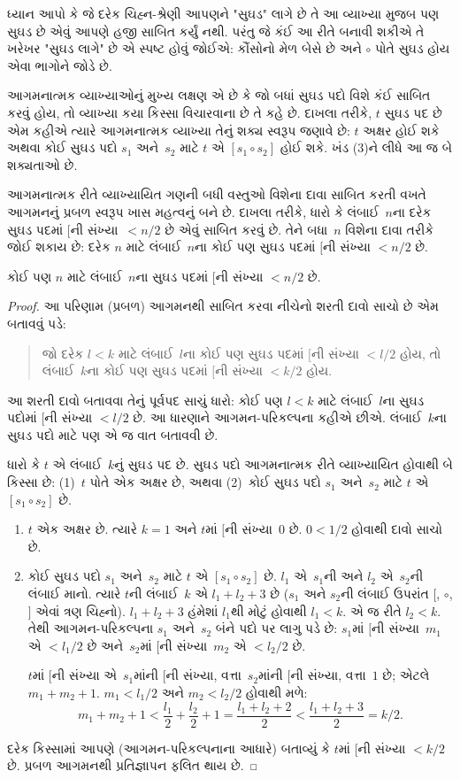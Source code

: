 \documentclass[../../../include/open-logic-section]{subfiles}
\begin{document}
ધ્યાન આપો કે જે દરેક ચિહ્ન-શ્રેણી આપણને "સુઘડ"
લાગે છે તે આ વ્યાખ્યા મુજબ પણ સુઘડ છે એવું
આપણે હજી સાબિત કર્યું નથી. પરંતુ જે કંઈ આ
રીતે બનાવી શકીએ તે ખરેખર "સુઘડ લાગે" છે
એ સ્પષ્ટ હોવું જોઈએ: કૌંસોનો મેળ બેસે છે અને
$\circ$ પોતે સુઘડ હોય એવા ભાગોને જોડે છે.

આગમનાત્મક વ્યાખ્યાઓનું મુખ્ય લક્ષણ એ છે કે જો
બધાં સુઘડ પદો વિશે કંઈ સાબિત કરવું હોય, તો વ્યાખ્યા
કયા કિસ્સા વિચારવાના છે તે કહે છે. દાખલા તરીકે,
$t$ સુઘડ પદ છે એમ કહીએ ત્યારે આગમનાત્મક
વ્યાખ્યા તેનું શક્ય સ્વરૂપ જણાવે છે: $t$ અક્ષર
હોઈ શકે અથવા કોઈ સુઘડ પદો $s_1$ અને~$s_2$
માટે $t$ એ $[s_1 \circ s_2]$ હોઈ શકે. ખંડ (3)ને
લીધે આ જ બે શક્યતાઓ છે.

આગમનાત્મક રીતે વ્યાખ્યાયિત ગણની બધી વસ્તુઓ
વિશેના દાવા સાબિત કરતી વખતે આગમનનું પ્રબળ સ્વરૂપ
ખાસ મહત્વનું બને છે. દાખલા તરીકે, ધારો કે
લંબાઈ~$n$ના દરેક સુઘડ પદમાં $[$ની સંખ્યા~$< n/2$
છે એવું સાબિત કરવું છે. તેને બધા~$n$ વિશેના
દાવા તરીકે જોઈ શકાય છે: દરેક $n$ માટે લંબાઈ~$n$ના
કોઈ પણ સુઘડ પદમાં $[$ની સંખ્યા $< n/2$ છે.

\begin{prop}
  કોઈ પણ $n$ માટે લંબાઈ~$n$ના સુઘડ પદમાં
  $[$ની સંખ્યા $< n/2$ છે.
\end{prop}

\begin{proof}
આ પરિણામ (પ્રબળ) આગમનથી સાબિત કરવા નીચેનો
શરતી દાવો સાચો છે એમ બતાવવું પડે:
\begin{quote}
  જો દરેક $l < k$ માટે લંબાઈ~$l$ના કોઈ પણ
  સુઘડ પદમાં $[$ની સંખ્યા $< l/2$ હોય,
  તો લંબાઈ~$k$ના કોઈ પણ સુઘડ પદમાં
  $[$ની સંખ્યા $< k/2$ હોય.
\end{quote}
આ શરતી દાવો બતાવવા તેનું પૂર્વપદ સાચું ધારો:
કોઈ પણ $l<k$ માટે લંબાઈ~$l$ના સુઘડ પદોમાં
$[$ની સંખ્યા $< l/2$ છે. આ ધારણાને
આગમન-પરિકલ્પના કહીએ છીએ. લંબાઈ~$k$ના
સુઘડ પદો માટે પણ એ જ વાત બતાવવી છે.

ધારો કે $t$ એ લંબાઈ~$k$નું સુઘડ પદ છે.
સુઘડ પદો આગમનાત્મક રીતે વ્યાખ્યાયિત હોવાથી
બે કિસ્સા છે: (1)~$t$ પોતે એક અક્ષર છે,
અથવા (2)~કોઈ સુઘડ પદો $s_1$ અને~$s_2$
માટે $t$ એ $[s_1 \circ s_2]$ છે.
\begin{enumerate}
\item $t$ એક અક્ષર છે. ત્યારે $k = 1$ અને
$t$માં $[$ની સંખ્યા~$0$ છે. $0 < 1/2$
હોવાથી દાવો સાચો છે.
\item કોઈ સુઘડ પદો $s_1$ અને~$s_2$ માટે
$t$ એ $[s_1 \circ s_2]$ છે. $l_1$ એ~$s_1$ની
અને $l_2$ એ~$s_2$ની લંબાઈ માનો. ત્યારે $t$ની
લંબાઈ~$k$ એ $l_1+l_2+3$ છે ($s_1$ અને
$s_2$ની લંબાઈ ઉપરાંત $[$, $\circ$, $]$
એવાં ત્રણ ચિહ્નો). $l_1+l_2+3$ હંમેશાં
$l_1$થી મોટું હોવાથી $l_1 < k$. એ જ રીતે
$l_2 < k$. તેથી આગમન-પરિકલ્પના $s_1$ અને~$s_2$
બંને પદો પર લાગુ પડે છે: $s_1$માં $[$ની
સંખ્યા~$m_1$ એ $< l_1/2$ છે અને~$s_2$માં
$[$ની સંખ્યા~$m_2$ એ $< l_2/2$ છે.

  $t$માં $[$ની સંખ્યા એ~$s_1$માંની $[$ની
  સંખ્યા, વત્તા~$s_2$માંની $[$ની સંખ્યા,
  વત્તા~$1$ છે; એટલે $m_1 + m_2 + 1$.
  $m_1 < l_1/2$ અને $m_2 < l_2/2$
  હોવાથી મળે:
  \[
  m_1 + m_2 + 1 < \frac{l_1}{2} + \frac{l_2}{2} + 1 = \frac{l_1+l_2+2}{2} < \frac{l_1+l_2+3}{2} = k/2.
  \]
\end{enumerate}
દરેક કિસ્સામાં આપણે (આગમન-પરિકલ્પનાના આધારે)
બતાવ્યું કે $t$માં $[$ની સંખ્યા $< k/2$ છે.
પ્રબળ આગમનથી પ્રતિજ્ઞાપન ફલિત થાય છે.
\end{proof}
\end{document}
